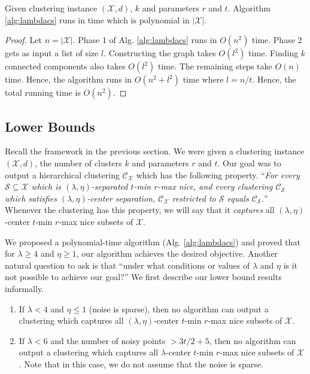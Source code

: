 \documentclass[anon,12pt]{colt2016} %
\newcommand{\mc}{\mathcal}
\begin{document}
\begin{theorem}
Given clustering instance $(\mc X, d)$, $k$ and parameters $r$ and $t$. Algorithm \ref{alg:lambdacs} runs in time which is polynomial in $|\mc X|$.
\end{theorem}

\begin{proof}
Let $n = |\mc X|$. Phase 1 of Alg. \ref{alg:lambdacs} runs in $O(n^2)$ time. Phase 2 gets as input a list of size $l$. Constructing the graph takes $O(l^2)$ time. Finding $k$ connected components also takes $O(l^2)$ time. The remaining steps take $O(n)$ time. Hence, the algorithm runs in $O(n^2 + l^2)$ time where $l = n/t$. Hence, the total running time is $O(n^2)$.
\end{proof}

\subsection{Lower Bounds}
Recall the framework in the previous section. We were given a clustering instance $(\mc X, d)$, the number of clusters $k$ and parameters $r$ and $t$. Our goal was to output a hierarchical clustering $\mc C_{\mc X}$ which has the following property. ``{\it For every $\mc S \subseteq \mc X$ which is $(\lambda, \eta)$-separated $t$-min $r$-max nice, and every clustering $\mc C_{\mc S}$ which satisfies $(\lambda, \eta)$-center separation, $\mc C_{\mc X}$ restricted to $\mc S$ equals $\mc C_{\mc S}$.}'' Whenever the clustering has this property, we will say that it {\it captures} all $(\lambda, \eta)$-center $t$-min $r$-max nice subsets of $\mc X$.

We proposed a polynomial-time algorithm (Alg. \ref{alg:lambdacs}) and proved that for $\lambda \ge 4$ and $\eta \ge 1$, our algorithm achieves the desired objective. Another natural question to ask is that ``under what conditions or values of $\lambda$ and $\eta$ is it not possible to achieve our goal?'' We first describe our lower bound results informally.

\begin{enumerate}[nolistsep, noitemsep, label=\textbf{L.\arabic*}]
\renewcommand\labelitemi{$\diamond$}
\item \label{lowerBd:lambdacs1} If $\lambda < 4$ and $\eta \le 1$ (noise is sparse), then no algorithm can output a clustering which captures all $(\lambda, \eta)$-center $t$-min $r$-max nice subsets of $\mc X$.
\item \label{lowerBd:lambdacs2} If $\lambda < 6$ and the number of noisy points $ > 3t/2+5$, then no algorithm can output a clustering which captures all $\lambda$-center $t$-min $r$-max nice subsets of $\mc X$. Note that in this case, we do not assume that the noise is sparse.
\end{enumerate}
\end{document}
